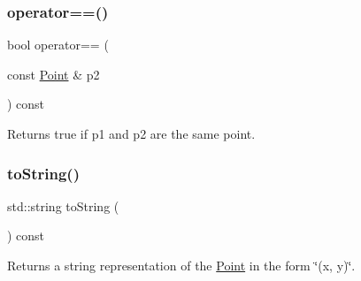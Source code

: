 \mbox{\label{classPoint_a66555fdca04ab3b9217ba2ed259be2b9}} 
\subsubsection{\texorpdfstring{operator==()}{operator==()}}
{\footnotesize\ttfamily bool operator== (\begin{DoxyParamCaption}\item[{const \mbox{\hyperlink{classPoint}{Point}} \&}]{p2 }\end{DoxyParamCaption}) const}



Returns {\ttfamily true} if {\ttfamily p1} and {\ttfamily p2} are the same point. 

\mbox{\label{classPoint_a1fe5121d6528fdea3f243321b3fa3a49}} 
\subsubsection{\texorpdfstring{to\+String()}{toString()}}
{\footnotesize\ttfamily std\+::string to\+String (\begin{DoxyParamCaption}{ }\end{DoxyParamCaption}) const}



Returns a string representation of the {\ttfamily \mbox{\hyperlink{classPoint}{Point}}} in the form {\ttfamily \char`\"{}(x, y)\char`\"{}}. 

